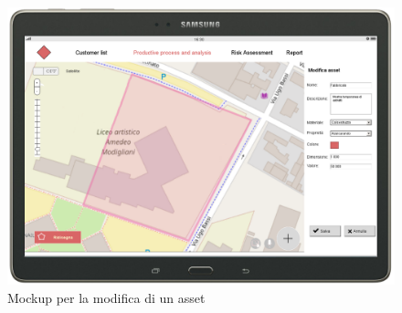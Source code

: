 \begin{figure}[H]
	\centering
	\includegraphics[width=\textwidth]{img/MockUp/m8.png}
	\caption{Mockup per la modifica di un asset}
\end{figure}

\newpage
